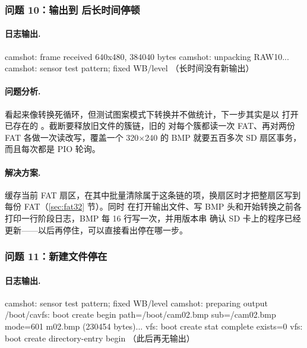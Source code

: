 \subsubsection{问题 10：输出到  后长时间停顿}

\paragraph{日志输出.}
\begin{txtcode}
camshot: frame received 640x480, 384040 bytes
camshot: unpacking RAW10...
camshot: sensor test pattern; fixed WB/level
（长时间没有新输出）
\end{txtcode}

\paragraph{问题分析.} 看起来像转换死循环，但测试图案模式下转换并不做统计，下一步其实是以  打开已存在的 。截断要释放旧文件的簇链，旧的  对每个簇都读一次 FAT、再对两份 FAT 各做一次读改写，覆盖一个 320$\times$240 的 BMP 就要五百多次 SD 扇区事务，而且每次都是 PIO 轮询。

\paragraph{解决方案.}  缓存当前 FAT 扇区，在其中批量清除属于这条链的项，换扇区时才把整扇区写到每份 FAT（\ref{sec:fat32} 节）。同时  在打开输出文件、写 BMP 头和开始转换之前各打印一行阶段日志，BMP 每 16 行写一次，并用版本串  确认 SD 卡上的程序已经更新——以后再停住，可以直接看出停在哪一步。

\subsubsection{问题 11：新建文件停在 }

\paragraph{日志输出.}
\begin{txtcode}
camshot: sensor test pattern; fixed WB/level
camshot: preparing output /boot/cavfs: boot create begin path=/boot/cam02.bmp sub=/cam02.bmp mode=601
m02.bmp (230454 bytes)...
vfs: boot create stat complete exists=0
vfs: boot create directory-entry begin
（此后再无输出）
\end{txtcode}

